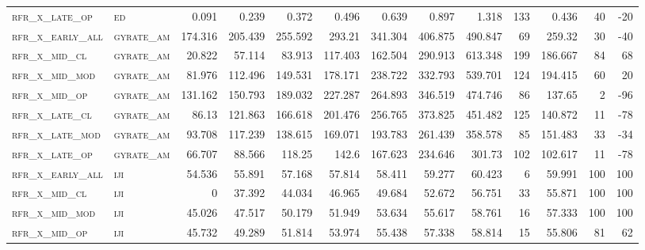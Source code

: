 \begin{landscape}
\begin{center}
\begin{footnotesize}
\begin{longtable}{llrrrrrrrr|rrr}
\textsc{rfr\_x\_late\_op  } & \textsc{ed        }   & 0.091   & 0.239   & 0.372   & 0.496    & 0.639    & 0.897    & 1.318    & 133    & 0.436         & 40            & -20             \\
\textsc{rfr\_x\_early\_all} & \textsc{gyrate\_am}   & 174.316 & 205.439 & 255.592 & 293.21   & 341.304  & 406.875  & 490.847  & 69     & 259.32        & 30            & -40             \\
\textsc{rfr\_x\_mid\_cl   } & \textsc{gyrate\_am}   & 20.822  & 57.114  & 83.913  & 117.403  & 162.504  & 290.913  & 613.348  & 199    & 186.667       & 84            & 68              \\
\textsc{rfr\_x\_mid\_mod  } & \textsc{gyrate\_am}   & 81.976  & 112.496 & 149.531 & 178.171  & 238.722  & 332.793  & 539.701  & 124    & 194.415       & 60            & 20              \\
\textsc{rfr\_x\_mid\_op   } & \textsc{gyrate\_am}   & 131.162 & 150.793 & 189.032 & 227.287  & 264.893  & 346.519  & 474.746  & 86     & 137.65        & 2             & -96             \\
\textsc{rfr\_x\_late\_cl  } & \textsc{gyrate\_am}   & 86.13   & 121.863 & 166.618 & 201.476  & 256.765  & 373.825  & 451.482  & 125    & 140.872       & 11            & -78             \\
\textsc{rfr\_x\_late\_mod } & \textsc{gyrate\_am}   & 93.708  & 117.239 & 138.615 & 169.071  & 193.783  & 261.439  & 358.578  & 85     & 151.483       & 33            & -34             \\
\textsc{rfr\_x\_late\_op  } & \textsc{gyrate\_am}   & 66.707  & 88.566  & 118.25  & 142.6    & 167.623  & 234.646  & 301.73   & 102    & 102.617       & 11            & -78             \\
\textsc{rfr\_x\_early\_all} & \textsc{iji       }   & 54.536  & 55.891  & 57.168  & 57.814   & 58.411   & 59.277   & 60.423   & 6      & 59.991        & 100           & 100             \\
\textsc{rfr\_x\_mid\_cl   } & \textsc{iji       }   & 0       & 37.392  & 44.034  & 46.965   & 49.684   & 52.672   & 56.751   & 33     & 55.871        & 100           & 100             \\
\textsc{rfr\_x\_mid\_mod  } & \textsc{iji       }   & 45.026  & 47.517  & 50.179  & 51.949   & 53.634   & 55.617   & 58.761   & 16     & 57.333        & 100           & 100             \\
\textsc{rfr\_x\_mid\_op   } & \textsc{iji       }   & 45.732  & 49.289  & 51.814  & 53.974   & 55.438   & 57.338   & 58.814   & 15     & 55.806        & 81            & 62              \\

\end{longtable}
\end{footnotesize}
\end{center}
\end{landscape}
